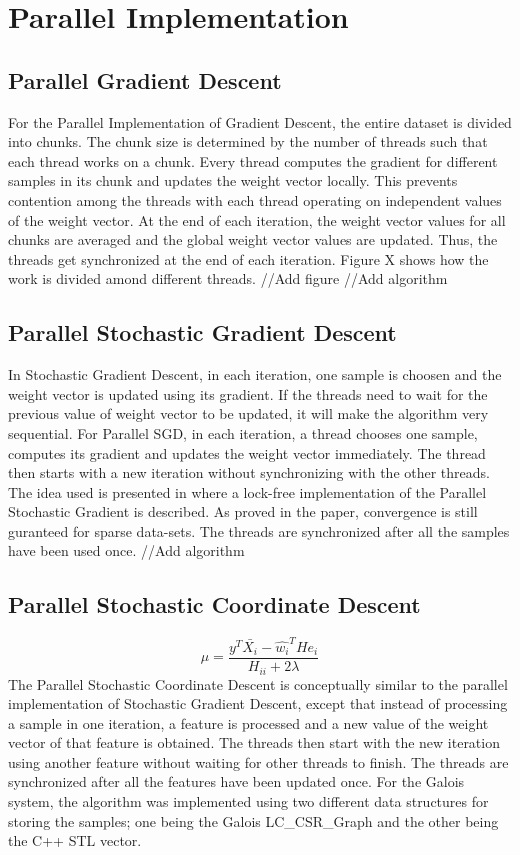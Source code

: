 \documentclass{sigplanconf}
\begin{document}
\section{Parallel Implementation}
\subsection{Parallel Gradient Descent}
For the Parallel Implementation of Gradient Descent, the entire dataset is divided into chunks. The chunk size is determined by the number
of threads such that each thread works on a chunk. Every thread computes the gradient for different samples in its chunk and updates
the weight vector locally. This prevents contention among the threads with each thread operating on independent values of the weight
vector. At the end of each iteration, the weight vector values for all chunks are averaged and the global weight vector
values are updated. Thus, the threads get synchronized at the end of each iteration. Figure X shows how the work is divided amond different
threads.
//Add figure
//Add algorithm

\subsection{Parallel Stochastic Gradient Descent}
In Stochastic Gradient Descent, in each iteration, one sample is choosen and the weight vector is updated using its gradient. 
If the threads need to wait for the previous value of weight vector to be updated, it will make the algorithm very sequential. For Parallel SGD, in each iteration, a thread chooses one sample, computes its gradient and updates the weight vector immediately. The thread then starts with a new iteration without synchronizing with the other threads. The idea used is presented in \cite{rich1} where a lock-free implementation of the Parallel Stochastic Gradient is described. As proved in the paper, convergence is still guranteed for sparse data-sets. The threads are synchronized after all the samples have been used once.
//Add algorithm

\subsection{Parallel Stochastic Coordinate Descent}
\begin{equation} \mu = \frac{y^T \bar{X_i} - \widehat{w_i}^T H e_i }{H_{ii} + 2\lambda} \end{equation}
The Parallel Stochastic Coordinate Descent is conceptually similar to the parallel implementation of Stochastic Gradient Descent, except that instead of
processing a sample in one iteration, a feature is processed and a new value of the weight vector of that feature is obtained. The threads then start with
the new iteration using another feature without waiting for other threads to finish. The threads are synchronized after all the features have been
updated once. For the Galois system, the algorithm was implemented using two different data structures for storing the samples; one being the 
Galois LC\_CSR\_Graph and the other being the C++ STL vector.
\end{document}
